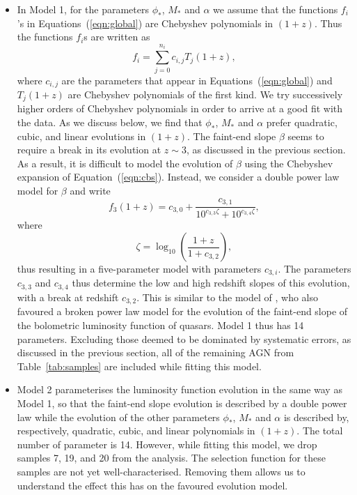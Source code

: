 \documentclass[fleqn,usenatbib]{mnras}
\begin{document}
      \begin{itemize}

      \item In Model 1, for the parameters $\phi_*$, $M_*$ and $\alpha$ we
        assume that the functions $f_i$'s in Equations~(\ref{eqn:global})
        are Chebyshev polynomials in $(1+z)$.  Thus the functions $f_i$s are
        written as
        \begin{equation}
          f_i=\sum_{j=0}^{n_i}c_{i,j}T_j(1+z),
          \label{eqn:cbs}
        \end{equation}
        where $c_{i,j}$ are the parameters that appear in
        Equations~(\ref{eqn:global}) and $T_j(1+z)$ are Chebyshev
        polynomials of the first kind.  We try successively higher orders of
        Chebyshev polynomials in order to arrive at a good fit with the
        data.  As we discuss below, we find that $\phi_*$, $M_*$ and
        $\alpha$ prefer quadratic, cubic, and linear evolutions in $(1+z)$.
        The faint-end slope $\beta$ seems to require a break in its
        evolution at $z\sim 3$, as discussed in the previous section.  As a
        result, it is difficult to model the evolution of $\beta$ using the
        Chebyshev expansion of Equation~(\ref{eqn:cbs}).  Instead, we
        consider a double power law model for $\beta$ and write 
        \begin{equation}
          f_3(1+z)=c_{3,0}+\frac{c_{3,1}}{10^{c_{3,3}\zeta}+10^{c_{3,4}\zeta}},
          \label{eqn:beta}
        \end{equation}
        where
        \begin{equation}
          \zeta = \log_{10}\left(\frac{1+z}{1+c_{3,2}}\right),
        \end{equation}
        thus resulting in a five-parameter model with parameters $c_{3,i}$.
        The parameters $c_{3,3}$ and $c_{3,4}$ thus determine the low and
        high redshift slopes of this evolution, with a break at redshift
        $c_{3,2}$.  This is similar to the model of
        \citet{2007ApJ...654..731H}, who also favoured a broken power law
        model for the evolution of the faint-end slope of the bolometric
        luminosity function of quasars.  Model 1 thus has 14 parameters.
        Excluding those deemed to be dominated by systematic errors, as
        discussed in the previous section, all of the remaining AGN from
        Table~\ref{tab:samples} are included while fitting this model.

      \item Model 2 parameterises the luminosity function evolution in the
        same way as Model 1, so that the faint-end slope evolution is
        described by a double power law while the evolution of the other
        parameters $\phi_*$, $M_*$ and $\alpha$ is described by,
        respectively, quadratic, cubic, and linear polynomials in $(1+z)$.
        The total number of parameter is 14.  However, while fitting this
        model, we drop samples 7, 19, and 20 from the analysis.  The
        selection function for these samples are not yet well-characterised.
        Removing them allows us to understand the effect this has on the
        favoured evolution model.


\end{itemize}
\end{document}
